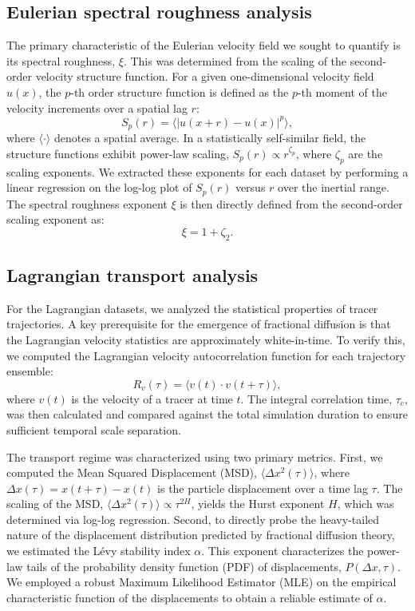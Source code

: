 \documentclass[]{article}
\begin{document}
\subsection{Eulerian spectral roughness analysis}
The primary characteristic of the Eulerian velocity field we sought to quantify is its spectral roughness, $\xi$. This was determined from the scaling of the second-order velocity structure function. For a given one-dimensional velocity field $u(x)$, the $p$-th order structure function is defined as the $p$-th moment of the velocity increments over a spatial lag $r$:
\begin{equation}
S_p(r) = \langle |u(x+r) - u(x)|^p \rangle,
\end{equation}
where $\langle \cdot \rangle$ denotes a spatial average. In a statistically self-similar field, the structure functions exhibit power-law scaling, $S_p(r) \propto r^{\zeta_p}$, where $\zeta_p$ are the scaling exponents. We extracted these exponents for each dataset by performing a linear regression on the log-log plot of $S_p(r)$ versus $r$ over the inertial range. The spectral roughness exponent $\xi$ is then directly defined from the second-order scaling exponent as:
\begin{equation}
\xi = 1 + \zeta_2.
\end{equation}

\subsection{Lagrangian transport analysis}
For the Lagrangian datasets, we analyzed the statistical properties of tracer trajectories. A key prerequisite for the emergence of fractional diffusion is that the Lagrangian velocity statistics are approximately white-in-time. To verify this, we computed the Lagrangian velocity autocorrelation function for each trajectory ensemble:
\begin{equation}
R_v(\tau) = \langle v(t) \cdot v(t+\tau) \rangle,
\end{equation}
where $v(t)$ is the velocity of a tracer at time $t$. The integral correlation time, $\tau_c$, was then calculated and compared against the total simulation duration to ensure sufficient temporal scale separation.

The transport regime was characterized using two primary metrics. First, we computed the Mean Squared Displacement (MSD), $\langle \Delta x^2(\tau) \rangle$, where $\Delta x(\tau) = x(t+\tau) - x(t)$ is the particle displacement over a time lag $\tau$. The scaling of the MSD, $\langle \Delta x^2(\tau) \rangle \propto \tau^{2H}$, yields the Hurst exponent $H$, which was determined via log-log regression. Second, to directly probe the heavy-tailed nature of the displacement distribution predicted by fractional diffusion theory, we estimated the Lévy stability index $\alpha$. This exponent characterizes the power-law tails of the probability density function (PDF) of displacements, $P(\Delta x, \tau)$. We employed a robust Maximum Likelihood Estimator (MLE) on the empirical characteristic function of the displacements to obtain a reliable estimate of $\alpha$.
\end{document}
